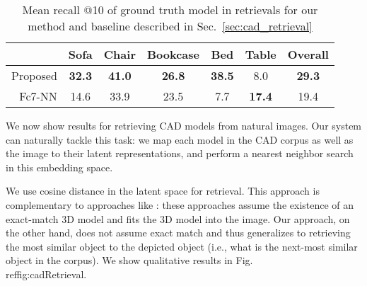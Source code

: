 \documentclass[runningheads]{llncs}
\begin{document}
\begin{figure}
\end{figure}\begin{table}[t]
\centering
\caption{Mean recall @10 of ground truth model in retrievals for our method and baseline 
described in Sec.\ \ref{sec:cad_retrieval}}
\label{tab:IKEAImageNN-Quant}
\begin{tabular}{r@{~~~}ccccc@{~~~}c} \toprule
                  & Sofa    & Chair     & Bookcase  & Bed       & Table  & Overall\\ \midrule
Proposed          & \bf 32.3  & \bf 41.0    & \bf 26.8    & \bf 38.5    & 8.0     & \bf 29.3    \\
Fc7-NN            & 14.6      & 33.9        & 23.5        & 7.7        & \bf 17.4   & 19.4   \\ \bottomrule
\end{tabular} 
\end{table}We now show results for retrieving CAD models from natural images. Our system
can naturally tackle this task: we map each model in the CAD corpus as
well as the
image to their latent representations, and perform a nearest neighbor
search in this embedding space.

We use cosine distance in the latent space for retrieval.
This approach is complementary to approaches like
\cite{Lim13,Lim14}: these approaches assume the existence of an exact-match 3D
model and fits the 3D model into the image. Our approach, on the other hand,
does not assume exact match and thus generalizes to retrieving the most similar object to
the depicted object (i.e., what is the next-most similar object in the
corpus). We show qualitative results in Fig.\\ref{fig:cadRetrieval}.
\end{document}
